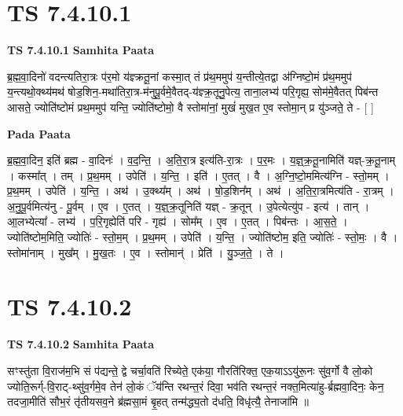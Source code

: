 \documentclass[17pt]{extarticle}
\begin{document}
\section*{ TS 7.4.10.1 }

\textbf{TS 7.4.10.1 } \newline
\textbf{Samhita Paata} \newline

ब्र॒ह्म॒वा॒दिनो॑ वदन्त्यतिरा॒त्रः प॑र॒मो य॑ज्ञ्क्रतू॒नां कस्मा॒त् तं प्र॑थ॒ममुप॑ य॒न्तीत्ये॒तद्वा अ॑ग्निष्टो॒मं प्र॑थ॒ममुप॑ य॒न्त्यथो॒क्थ्य॑मथ॑ षोड॒शिन॒-मथा॑तिरा॒त्र-म॑नुपू॒र्वमे॒वैतद्-य॑ज्ञ्क्र॒तूनु॒पेत्य॒ ताना॒लभ्य॑ परि॒गृह्य॒ सोम॑मे॒वैतत् पिब॑न्त आसते॒ ज्योति॑ष्टोमं प्रथ॒ममुप॑ यन्ति॒ ज्योति॑ष्टोमो॒ वै स्तोमा॑नां॒ मुखं॑ मुख॒त ए॒व स्तोमा॒न् प्र यु॑ञ्जते॒ ते - [  ] \newline

\textbf{Pada Paata} \newline

ब्र॒ह्म॒वा॒दिन॒ इति॑ ब्रह्म - वा॒दिनः॑ । व॒द॒न्ति॒ । अ॒ति॒रा॒त्र इत्य॑ति-रा॒त्रः । प॒र॒मः । य॒ज्ञ्॒क्र॒तू॒नामिति॑ यज्ञ्-क्र॒तू॒नाम् । कस्मा᳚त् । तम् । प्र॒थ॒मम् । उपेति॑ । य॒न्ति॒ । इति॑ । ए॒तत् । वै । अ॒ग्नि॒ष्टो॒ममित्य॑ग्नि - स्तो॒मम् । प्र॒थ॒मम् । उपेति॑ । य॒न्ति॒ । अथ॑ । उ॒क्थ्य᳚म् । अथ॑ । षो॒ड॒शिन᳚म् । अथ॑ । अ॒ति॒रा॒त्रमित्य॑ति - रा॒त्रम् । अ॒नु॒पू॒र्वमित्य॑नु - पू॒र्वम् । ए॒व । ए॒तत् । य॒ज्ञ्॒क्र॒तूनिति॑ यज्ञ् - क्र॒तून् । उ॒पेत्येत्यु॑प - इत्य॑ । तान् । आ॒लभ्येत्या᳚ - लभ्य॑ । प॒रि॒गृह्येति॑ परि - गृह्य॑ । सोम᳚म् । ए॒व । ए॒तत् । पिब॑न्तः । आ॒स॒ते॒ । ज्योति॑ष्टोम॒मिति॒ ज्योतिः॑ - स्तो॒म॒म् । प्र॒थ॒मम् । उपेति॑ । य॒न्ति॒ । ज्योति॑ष्टोम॒ इति॒ ज्योतिः॑ - स्तो॒मः॒ । वै । स्तोमा॑नाम् । मुख᳚म् । मु॒ख॒तः । ए॒व । स्तोमान्॑ । प्रेति॑ । यु॒ञ्ज॒ते॒ । ते ।  \newline




\section*{ TS 7.4.10.2 }

\textbf{TS 7.4.10.2 } \newline
\textbf{Samhita Paata} \newline

सꣳस्तु॑ता वि॒राज॑म॒भि सं प॑द्यन्ते॒ द्वे चर्चा॒वति॑ रिच्येते॒ एक॑या॒ गौरति॑रिक्त॒ एक॒याऽऽयु॑रू॒नः सु॑व॒र्गो वै लो॒को ज्योति॒रूर्ग्-वि॒राट्-थ्सु॑व॒र्गमे॒व तेन॑ लो॒कं ॅय॑न्ति रथन्त॒रं दिवा॒ भव॑ति रथन्त॒रं नक्त॒मित्या॑हु-र्ब्रह्मवा॒दिनः॒ केन॒ तदजा॒मीति॑ सौभ॒रं तृ॑तीयसव॒ने ब्र॑ह्मसा॒मं बृ॒हत् तन्म॑द्ध्य॒तो द॑धति॒ विधृ॑त्यै॒ तेनाजा॑मि ॥ \newline
\end{document}
